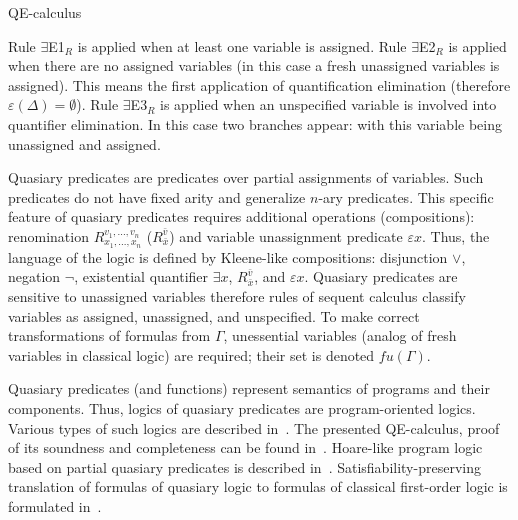\begin{entry}{QE-calculus}
\begin{calculus}
\begin{center}
\begin{minipage}[t]{0.90\textwidth}
\raisebox{5pt}{$\exists$E3$_R$} 
\end{minipage}
\end{center}
Rule $\exists$E1$_R$  is applied when at least one variable is assigned.
Rule $\exists$E2$_R$ is applied when there are no assigned variables (in this
case a fresh unassigned variables is assigned). This means  the first
application of quantification elimination (therefore $\varepsilon
(\Delta)=\emptyset$).  Rule $\exists$E3$_R$ is applied when an unspecified
variable is involved into quantifier elimination. In this case two branches
appear:  with this variable being unassigned and assigned.  

\end{calculus}


\begin{clarifications}
  Quasiary predicates are predicates over partial assignments of variables. Such
  predicates do not have fixed arity and generalize $n$-ary predicates. This
  specific feature of quasiary predicates requires additional operations
  (compositions): renomination $R_{x_{1} ,...,x_{n} }^{v_{1} ,...,v_{n} }$
  ($R^{\bar v}_{\bar x}$) and  variable unassignment  predicate $\varepsilon x$.
  Thus, the language of the logic is defined by Kleene-like compositions:
  disjunction $\vee$, negation $\neg$, existential quantifier $\exists x$,
  $R^{\bar v}_{\bar x}$, and $\varepsilon x$. Quasiary predicates are sensitive to
  unassigned variables therefore rules of sequent calculus classify variables as
  assigned, unassigned, and unspecified. To make correct transformations of
  formulas from $\Gamma$, unessential variables (analog of fresh variables in
  classical logic) are required; their set is denoted $fu(\Gamma)$.      
\end{clarifications}

\begin{history}
  Quasiary predicates (and functions) represent semantics of programs and their
  components.  Thus, logics of quasiary predicates are program-oriented logics.
  Various types of such logics are described in~\cite{NikShk2008,NikShk2013}. The
  presented QE-calculus, proof of its soundness and completeness can be found
  in~\cite{NikShk2017}. Hoare-like program logic based on partial quasiary predicates
  is described in~\cite{KNS2013}. Satisfiability-preserving translation of
  formulas of quasiary logic to formulas of classical first-order logic is
  formulated in~\cite{NikTym2012}.
\end{history}


\end{entry}
